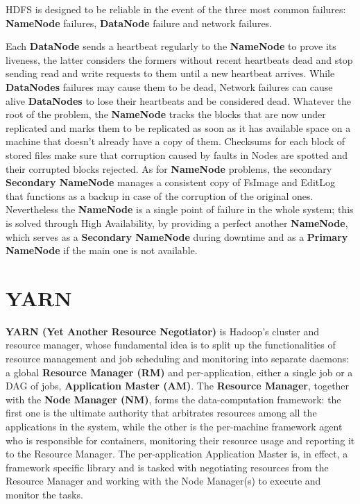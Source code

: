 HDFS is designed to be reliable in the event of the three most common failures: \textbf{NameNode} failures, \textbf{DataNode} failure and network failures.

Each \textbf{DataNode} sends a heartbeat regularly to the \textbf{NameNode} to prove its liveness, the latter considers the formers without recent heartbeats dead and stop sending read and write requests to them until a new heartbeat arrives.\newline
While \textbf{DataNodes} failures may cause them to be dead, Network failures can cause alive \textbf{DataNodes} to lose their heartbeats and be considered dead.\newline
Whatever the root of the problem, the \textbf{NameNode} tracks the blocks that are now under replicated and marks them to be replicated as soon as it has available space on a machine that doesn't already have a copy of them.\newline
Checksums for each block of stored files make sure that corruption caused by faults in Nodes are spotted and their corrupted blocks rejected.\newline
As for \textbf{NameNode} problems, the secondary \textbf{Secondary NameNode} manages a consistent copy of FsImage and EditLog that functions as a backup in case of the corruption of the original ones. Nevertheless the \textbf{NameNode} is a single point of failure in the whole system; this is solved through High Availability, by providing a perfect another \textbf{NameNode}, which serves as a \textbf{Secondary NameNode} during downtime and as a \textbf{Primary NameNode} if the main one is not available.

\pagebreak
\section{YARN} \label{YARN}

\textbf{YARN (Yet Another Resource Negotiator)} is Hadoop's cluster and resource manager, whose fundamental idea is to split up the functionalities of resource management and job scheduling and monitoring into separate daemons: a global \textbf{Resource Manager (RM)} and per-application, either a single job or a DAG of jobs, \textbf{Application Master (AM)}.
\newline\newline
The \textbf{Resource Manager}, together with the \textbf{Node Manager (NM)}, forms the data-computation framework: the first one is the ultimate authority that arbitrates resources among all the applications in the system, while the other is the per-machine framework agent who is responsible for containers, monitoring their resource usage and reporting it to the Resource Manager.
\newline\newline
The per-application Application Master is, in effect, a framework specific library and is tasked with negotiating resources from the Resource Manager and working with the Node Manager(s) to execute and monitor the tasks.

